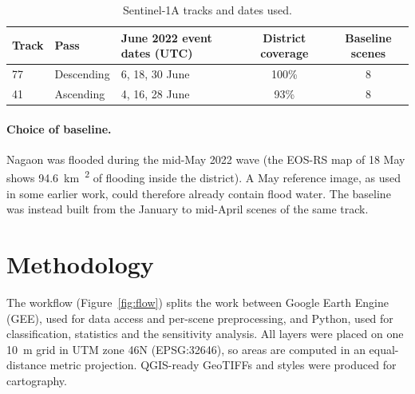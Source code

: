 \documentclass[11pt,a4paper]{article}
\newcommand{\kmsq}{km\textsuperscript{2}}
\begin{document}
\begin{table}[H]
\centering\small
\caption{Sentinel-1A tracks and dates used.}
\label{tab:s1}
\begin{tabular}{lllcc}
\toprule
Track & Pass & June 2022 event dates (UTC) & District coverage & Baseline scenes\\
\midrule
77 & Descending & 6, 18, 30 June & 100\% & 8\\
41 & Ascending & 4, 16, 28 June & 93\% & 8\\
\bottomrule
\end{tabular}
\end{table}

\paragraph{Choice of baseline.} Nagaon was flooded during the mid-May 2022 wave
(the EOS-RS map of 18 May shows \SI{94.6}{\kmsq} of flooding inside the district). A May reference image,
as used in some earlier work, could therefore already contain flood water. The baseline was instead built
from the January to mid-April scenes of the same track.

\section{Methodology}
The workflow (Figure~\ref{fig:flow}) splits the work between Google Earth Engine (GEE), used for data
access and per-scene preprocessing, and Python, used for classification, statistics and the sensitivity
analysis. All layers were placed on one \SI{10}{m} grid in UTM zone 46N (EPSG:32646), so areas are
computed in an equal-distance metric projection. QGIS-ready GeoTIFFs and styles were produced for
cartography.
\end{document}

